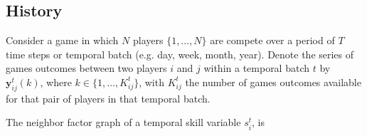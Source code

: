 \documentclass[article]{jss}
\newif\ifen
\newif\ifes
\newcommand{\en}[1]{\ifen#1\fi}
\newcommand{\es}[1]{\ifes#1\fi}
\newcommand{\vm}[1]{\mathbf{#1}}
\begin{document}
\subsection{History} \label{sec:history}


Consider a game in which $N$ players $\{1, \dots, N\}$ are compete over a period of $T$ time steps or temporal batch (e.g. day, week, month, year).
Denote the series of games outcomes between two players $i$ and $j$ within a temporal batch $t$ by $\vm{y}^t_{ij}(k)$, where $k \in \{1,\dots,K^t_{ij}\}$, with $K^t_{ij}$ the number of games outcomes available for that pair of players in that temporal batch.

\en{
\begin{itemize}
 \item Inference within a temporal batch (day, week, month) depends on the random order chosen for the update. However the results should be independent of the order of games within the temporal batch.
 \item Information across temporal batch is only propagated forward in time, so we can not propagate information backwards.
\end{itemize}
}
\es{\begin{itemize}
		\item Inferencia entre un bache temporal (d\'ia, semana, mes) depende del orden aleatorio elegido para la actualizaci\'on. De todas formas el resultado deberia ser independiente del orden de los juegos dentro de un bache temporal.
		\item La informaci\'on a trav\'es de un bache es solo propagado de manera temporal hacia adelante, no pudiendo propagarla en sentido contrario.
\end{itemize}}


The neighbor factor graph of a temporal skill variable $s_i^t$, is
\end{document}
